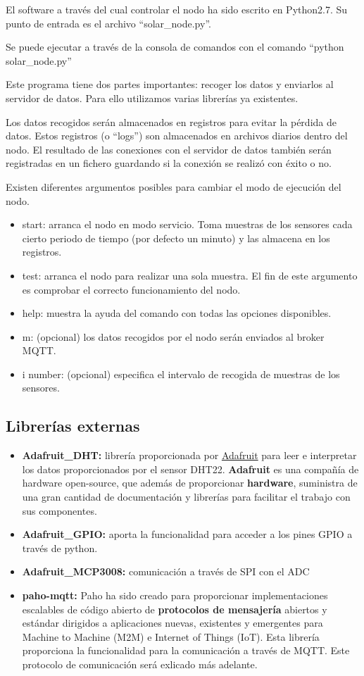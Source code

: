 El software a través del cual controlar el nodo ha sido escrito en Python2.7. Su punto de entrada es el archivo ``solar\_node.py''.

Se puede ejecutar a través de la consola de comandos con el comando ``python solar\_node.py''

Este programa tiene dos partes importantes: recoger los datos y enviarlos al servidor de datos. Para ello utilizamos varias librerías ya existentes.

Los datos recogidos serán almacenados en registros para evitar la pérdida de datos. Estos registros (o ``logs'') son almacenados en archivos diarios dentro del nodo. El resultado de las conexiones con el servidor de datos también serán registradas en un fichero guardando si la conexión se realizó con éxito o no.

Existen diferentes argumentos posibles para cambiar el modo de ejecución del nodo.
\begin{itemize}
\item start: arranca el nodo en modo servicio. Toma muestras de los sensores cada cierto periodo de tiempo (por defecto un minuto) y las almacena en los registros.
\item test: arranca el nodo para realizar una sola muestra. El fin de este argumento es comprobar el correcto funcionamiento del nodo.
\item help: muestra la ayuda del comando con todas las opciones disponibles.
\item m: (opcional) los datos recogidos por el nodo serán enviados al broker MQTT.
\item i number: (opcional) especifica el intervalo de recogida de muestras de los sensores. 
\end{itemize}

\subsection{Librerías externas}

\begin{itemize}  
\item \textbf{Adafruit\_DHT:} librería proporcionada por \href{https://www.adafruit.com/}{Adafruit} para leer e interpretar los datos proporcionados por el sensor DHT22. \textbf{Adafruit} es una compañía de hardware open-source, que además de proporcionar \textbf{hardware}, suministra de una gran cantidad de documentación y librerías para facilitar el trabajo con sus componentes. 
\item \textbf{Adafruit\_GPIO:} aporta la funcionalidad para acceder a los pines GPIO a través de python.
\item \textbf{Adafruit\_MCP3008:} comunicación a través de SPI con el ADC
\item \textbf{paho-mqtt:} Paho ha sido creado para proporcionar implementaciones escalables de código abierto de \textbf{protocolos de mensajería} abiertos y estándar dirigidos a aplicaciones nuevas, existentes y emergentes para Machine to Machine (M2M) e Internet of Things (IoT). Esta librería proporciona la funcionalidad para la comunicación a través de MQTT. Este protocolo de comunicación será exlicado más adelante.
\end{itemize}